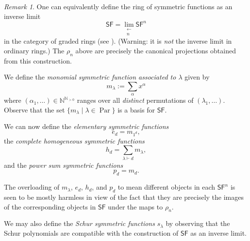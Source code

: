 \documentclass[12pt]{article}
\theoremstyle{plain}
\theoremstyle{definition}
\theoremstyle{remark}
\newtheorem{remark}[theorem]{Remark}
\numberwithin{equation}{section}
\begin{document}
\begin{remark}
One can equivalently define the ring of symmetric functions as an inverse
limit
\[
\mathsf{SF} = \lim_{\substack{\longleftarrow\\n}} \mathsf{SF}^n
\]
in the category of graded rings (see \cite{Macdonald}).
(Warning: it is \emph{not} the inverse limit in ordinary rings.)
The $\rho_n$ above are precisely the canonical projections obtained from
this construction.
\end{remark}

We define the \emph{monomial symmetric function associated to $\lambda$}
given by
\[
m_\lambda := \sum_{\alpha} x^\alpha
\]
where $(\alpha_1,\ldots) \in \mathbb{N}^{\mathbb{N}_{>0}}$ ranges over all
\emph{distinct} permutations of $(\lambda_1,\ldots)$.
Observe that the set $\{ m_\lambda \mid \lambda \in
\operatorname{Par}\}$ is a basis for $\mathsf{SF}$.

We can now define the \emph{elementary symmetric functions}
\[
e_d = m_{1^d},
\]
the \emph{complete homogeneous symmetric functions}
\[
h_d = \sum_{\lambda \vdash d} m_\lambda ,
\]
and the \emph{power sum symmetric functions}
\[
p_d = m_{d}.
\]

The overloading of $m_\lambda$, $e_d$, $h_d$, and $p_d$ to mean
different objects in each $\mathsf{SF}^n$ is seen to be mostly harmless
in view of the fact that they are precisely the images of the
corresponding objects in $\mathsf{SF}$ under the maps to $\rho_n$.

We may also define the \emph{Schur symmetric functions}
$s_\lambda$ by observing that the Schur polynomials are compatible
with the construction of $\mathsf{SF}$ as an inverse limit.


\end{document}
